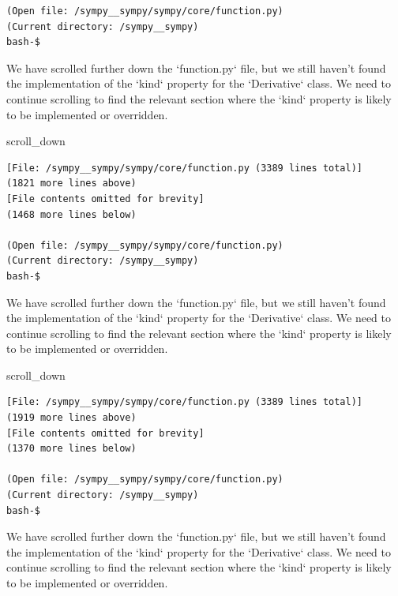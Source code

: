 {\begin{observationbox}
\begin{Verbatim}[breaklines=true, breakanywhere=true]
(Open file: /sympy__sympy/sympy/core/function.py)
(Current directory: /sympy__sympy)
bash-$
\end{Verbatim}
\end{observationbox}
\begin{agentbox}
We have scrolled further down the `function.py` file, but we still haven't found the implementation of the `kind` property for the `Derivative` class. We need to continue scrolling to find the relevant section where the `kind` property is likely to be implemented or overridden.



\hrulefill
\begin{CodeVerbatim}[breaklines=true, breakanywhere=true]
scroll_down
\end{CodeVerbatim}
\end{agentbox}
\begin{observationbox}\begin{Verbatim}[breaklines=true, breakanywhere=true]
[File: /sympy__sympy/sympy/core/function.py (3389 lines total)]
(1821 more lines above)
[File contents omitted for brevity]
(1468 more lines below)

(Open file: /sympy__sympy/sympy/core/function.py)
(Current directory: /sympy__sympy)
bash-$
\end{Verbatim}
\end{observationbox}
\begin{agentbox}
We have scrolled further down the `function.py` file, but we still haven't found the implementation of the `kind` property for the `Derivative` class. We need to continue scrolling to find the relevant section where the `kind` property is likely to be implemented or overridden.



\hrulefill
\begin{CodeVerbatim}[breaklines=true, breakanywhere=true]
scroll_down
\end{CodeVerbatim}
\end{agentbox}
\begin{observationbox}\begin{Verbatim}[breaklines=true, breakanywhere=true]
[File: /sympy__sympy/sympy/core/function.py (3389 lines total)]
(1919 more lines above)
[File contents omitted for brevity]
(1370 more lines below)

(Open file: /sympy__sympy/sympy/core/function.py)
(Current directory: /sympy__sympy)
bash-$
\end{Verbatim}
\end{observationbox}
\begin{agentbox}
We have scrolled further down the `function.py` file, but we still haven't found the implementation of the `kind` property for the `Derivative` class. We need to continue scrolling to find the relevant section where the `kind` property is likely to be implemented or overridden.




\end{agentbox}}
